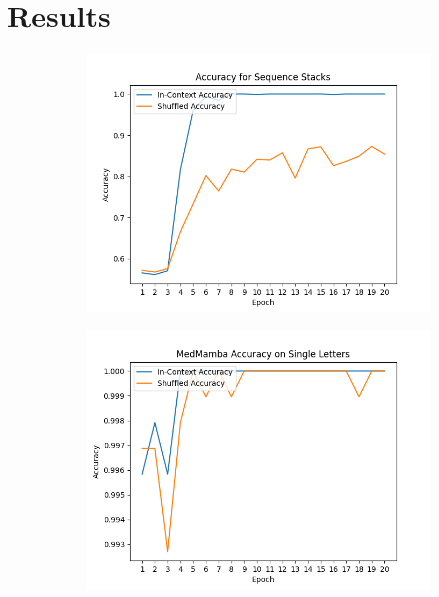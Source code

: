 \section{Results}
\begin{figure}[!ht]
    \begin{subfigure}{0.5\textwidth}
        \includegraphics[width=\textwidth]{figures/sequence_stack_mnist_like.png}
        \caption{}
        \label{resultsa}
    \end{subfigure}\begin{subfigure}{0.5\textwidth}
        \includegraphics[width=\textwidth]{figures/medmamba_mnist_like.png}
        \caption{}
        \label{resultsb}
    \end{subfigure}

\end{figure}

